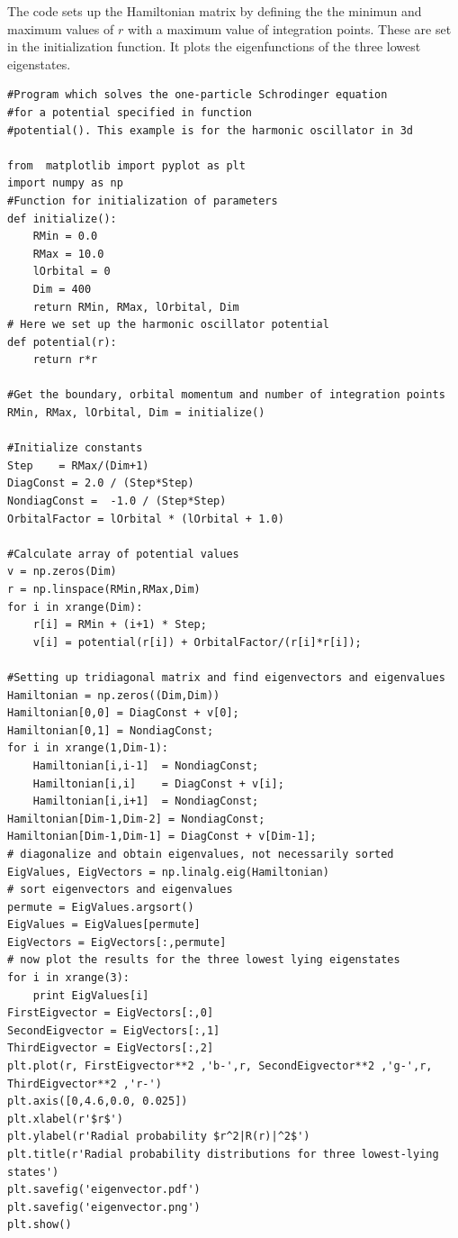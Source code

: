 \documentclass[%
twoside,                 %
final,                   %
10pt]{article}
\begin{document}
\noindent
The code sets up the Hamiltonian matrix by defining the the minimun and maximum values of $r$ with a
maximum value of integration points.  These are set in the initialization function. It plots the 
eigenfunctions of the three lowest eigenstates.
\begin{verbatim}
#Program which solves the one-particle Schrodinger equation 
#for a potential specified in function
#potential(). This example is for the harmonic oscillator in 3d

from  matplotlib import pyplot as plt
import numpy as np
#Function for initialization of parameters
def initialize():
    RMin = 0.0
    RMax = 10.0
    lOrbital = 0
    Dim = 400
    return RMin, RMax, lOrbital, Dim
# Here we set up the harmonic oscillator potential
def potential(r):
    return r*r

#Get the boundary, orbital momentum and number of integration points
RMin, RMax, lOrbital, Dim = initialize()

#Initialize constants
Step    = RMax/(Dim+1)
DiagConst = 2.0 / (Step*Step)
NondiagConst =  -1.0 / (Step*Step)
OrbitalFactor = lOrbital * (lOrbital + 1.0)

#Calculate array of potential values
v = np.zeros(Dim)
r = np.linspace(RMin,RMax,Dim)
for i in xrange(Dim):
    r[i] = RMin + (i+1) * Step;
    v[i] = potential(r[i]) + OrbitalFactor/(r[i]*r[i]);

#Setting up tridiagonal matrix and find eigenvectors and eigenvalues
Hamiltonian = np.zeros((Dim,Dim))
Hamiltonian[0,0] = DiagConst + v[0];
Hamiltonian[0,1] = NondiagConst;
for i in xrange(1,Dim-1):
    Hamiltonian[i,i-1]  = NondiagConst;
    Hamiltonian[i,i]    = DiagConst + v[i];
    Hamiltonian[i,i+1]  = NondiagConst;
Hamiltonian[Dim-1,Dim-2] = NondiagConst;
Hamiltonian[Dim-1,Dim-1] = DiagConst + v[Dim-1];
# diagonalize and obtain eigenvalues, not necessarily sorted
EigValues, EigVectors = np.linalg.eig(Hamiltonian)
# sort eigenvectors and eigenvalues
permute = EigValues.argsort()
EigValues = EigValues[permute]
EigVectors = EigVectors[:,permute]
# now plot the results for the three lowest lying eigenstates
for i in xrange(3):
    print EigValues[i]
FirstEigvector = EigVectors[:,0]
SecondEigvector = EigVectors[:,1]
ThirdEigvector = EigVectors[:,2]
plt.plot(r, FirstEigvector**2 ,'b-',r, SecondEigvector**2 ,'g-',r, ThirdEigvector**2 ,'r-')
plt.axis([0,4.6,0.0, 0.025])
plt.xlabel(r'$r$')
plt.ylabel(r'Radial probability $r^2|R(r)|^2$')
plt.title(r'Radial probability distributions for three lowest-lying states')
plt.savefig('eigenvector.pdf')
plt.savefig('eigenvector.png')
plt.show()

\end{verbatim}
\end{document}
